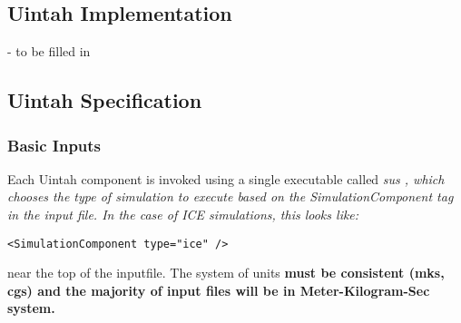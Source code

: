 \subsection{Uintah Implementation}
- to be filled in\\

\subsection{Uintah Specification}
\subsubsection{Basic Inputs}
Each Uintah component is invoked using a single executable called
\it sus \normalfont, which chooses the type of simulation
to execute based on the \it SimulationComponent \normalfont tag in the
input file.  In the case of ICE simulations, this looks like:
%
\begin{Verbatim}[fontsize=\footnotesize]
 <SimulationComponent type="ice" />
\end{Verbatim}
%
near the top of the inputfile.  The system of units \bf{must }\normalfont be
consistent (mks, cgs) and the majority of input files will be in Meter-Kilogram-Sec
system.


%
